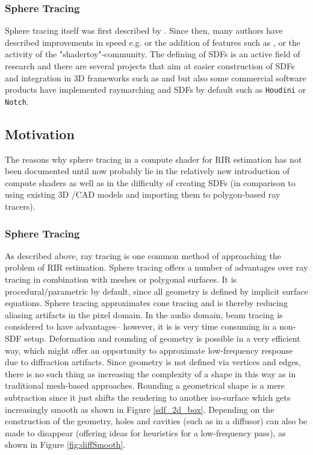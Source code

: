 \documentclass[twoside,a4paper]{article}
\begin{document}
\subsubsection*{Sphere Tracing}
Sphere tracing itself was first described by \cite{hart_sphere_1996}. Since then, many authors have described improvements in speed e.g. \cite{balint_accelerating_2018} or the addition of features such as \cite{quilez_inigo_nodate} \cite{sawhney_monte_2020}, \cite{keinert_enhanced_2014} or the activity of the "shadertoy"-community\cite{quilez_shadertoy_nodate}.
The defining of SDFs is an active field of research and there are several projects that aim at easier construction of SDFs and integration in 3D frameworks such as \cite{SDFunity}  and \cite{lechner_hrtlacektdraymarchtoolkit_2020} but 
also some commercial software products have implemented raymarching and SDFs by default such as \texttt{Houdini} or \texttt{Notch}.



\subsection{Motivation}
\label{subs:mot}
The reasons why sphere tracing in a compute shader for RIR estimation has not been documented until now probably lie in the relatively new introduction of compute shaders as well as in the difficulty of creating SDFs (in comparison to using existing 3D /CAD models and importing them to polygon-based ray tracers).
\subsubsection{Sphere Tracing}
As described above, ray tracing is one common method of approaching the problem of RIR estimation. Sphere tracing offers a number of advantages over ray tracing in combination with meshes or polygonal surfaces. It is procedural/parametric by default, since all geometry is defined by implicit surface equations. Sphere tracing approximates cone tracing and is thereby reducing aliasing artifacts in the pixel domain\cite{hart_sphere_1996}. In the audio domain, beam tracing is considered to have advantages-- however, it is is very time consuming in a non-SDF setup\cite{alpkocak_computing_2010}. Deformation and rounding of geometry is possible in a very efficient way, which might offer an opportunity to approximate low-frequency response due to diffraction artifacts. Since geometry is not defined via vertices and edges, there is no such thing as increasing the complexity of a shape in this way as in traditional mesh-based approaches. Rounding a geometrical shape is a mere subtraction since it just shifts the rendering to another iso-surface which gets increasingly smooth as shown in Figure \ref{sdf_2d_box}. Depending on the construction of the geometry, holes and cavities (such as in a diffusor) can also be made to disappear (offering ideas for heuristics for a low-frequency pass), as shown in Figure \ref{fig:diffSmooth}.
\end{document}
